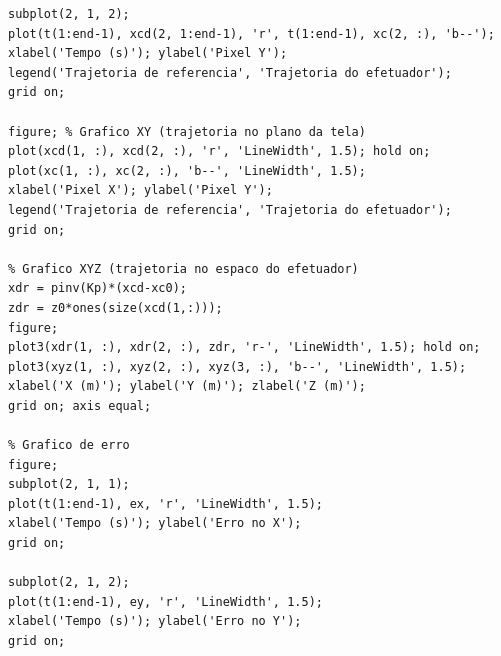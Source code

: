 \documentclass[10pt]{article}
\begin{document}
\begin{lstlisting}[caption={Código da segunda parte do trabalho}, label={code:subsecao22}]
subplot(2, 1, 2);
plot(t(1:end-1), xcd(2, 1:end-1), 'r', t(1:end-1), xc(2, :), 'b--');
xlabel('Tempo (s)'); ylabel('Pixel Y');
legend('Trajetoria de referencia', 'Trajetoria do efetuador');
grid on;

figure; % Grafico XY (trajetoria no plano da tela)
plot(xcd(1, :), xcd(2, :), 'r', 'LineWidth', 1.5); hold on;
plot(xc(1, :), xc(2, :), 'b--', 'LineWidth', 1.5);
xlabel('Pixel X'); ylabel('Pixel Y');
legend('Trajetoria de referencia', 'Trajetoria do efetuador');
grid on;

% Grafico XYZ (trajetoria no espaco do efetuador)
xdr = pinv(Kp)*(xcd-xc0);
zdr = z0*ones(size(xcd(1,:)));
figure;
plot3(xdr(1, :), xdr(2, :), zdr, 'r-', 'LineWidth', 1.5); hold on;
plot3(xyz(1, :), xyz(2, :), xyz(3, :), 'b--', 'LineWidth', 1.5);
xlabel('X (m)'); ylabel('Y (m)'); zlabel('Z (m)');
grid on; axis equal;

% Grafico de erro
figure;
subplot(2, 1, 1);
plot(t(1:end-1), ex, 'r', 'LineWidth', 1.5);
xlabel('Tempo (s)'); ylabel('Erro no X');
grid on;

subplot(2, 1, 2);
plot(t(1:end-1), ey, 'r', 'LineWidth', 1.5);
xlabel('Tempo (s)'); ylabel('Erro no Y');
grid on;
\end{lstlisting}
\end{document}
